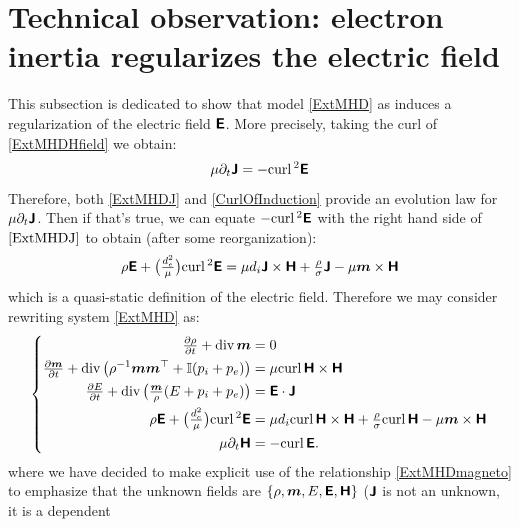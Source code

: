 \documentclass[preprint,1p]{elsarticle}
\begin{document}
\section{Technical observation: electron
inertia regularizes the electric field}\label{EliminationOfDJDt}







This subsection is dedicated to show that model \eqref{ExtMHD} as induces a
regularization of the electric field $\boldsymbol{\mathsf{E}}$. More precisely, taking the curl
of \eqref{ExtMHDHfield} we obtain:
\begin{align}
\label{CurlOfInduction}
\mu \partial_t \boldsymbol{\mathsf{J}} = - \text{curl} \, \mathbf{}^2 \boldsymbol{\mathsf{E}}
\end{align}
Therefore, both \eqref{ExtMHDJ} and \eqref{CurlOfInduction} provide an
evolution law for $\mu \partial_t \boldsymbol{\mathsf{J}}$. Then if that's true, we can equate
$- \text{curl} \, \mathbf{}^2 \boldsymbol{\mathsf{E}}$ with the right hand side of $\eqref{ExtMHDJ}$ to obtain
(after some reorganization):
\begin{align*}
\rho \boldsymbol{\mathsf{E}} + \big(\tfrac{d_e^2}{\mu}\big) \text{curl} \, \mathbf{}^2 \boldsymbol{\mathsf{E}}
= \mu d_i \boldsymbol{\mathsf{J}} \times \boldsymbol{\mathsf{H}}
+ \tfrac{\rho}{\sigma} \boldsymbol{\mathsf{J}}
- \mu \boldsymbol{m} \times \boldsymbol{\mathsf{H}}
\end{align*}
which is a quasi-static definition of the electric field. Therefore we may
consider rewriting system \eqref{ExtMHD} as:
\begin{align}
\label{ExtMHDref00}
\left\{
\begin{aligned}
\tfrac{\partial \rho}{\partial t} + \diver{}\mom &= 0 \\
%
\tfrac{\partial \mom}{\partial t} + \diver{}
\big( \rho^{-1} \mom\mom^\transp
+ \mathbb{I} (p_i + p_e) \big)
&=
\mu \curl{}\Hfield \times \Hfield \\
%
\tfrac{\partial \totme}{\partial t} + \diver{}\big( \tfrac{\mom}{\rho} (\totme +
p_i + p_e) \big)
&=
\Efield \cdot\current \\
%
%
\rho \Efield + \big(\tfrac{d_e^2}{\mu}\big) \curl{}^2 \Efield
&= \mu d_i \curl{}\Hfield \times \Hfield
+ \tfrac{\rho}{\conduct} \curl{}\Hfield
- \mu \mom \times \Hfield \\
%
\mu \partial_t \Hfield  &= - \curl{}\Efield .
\end{aligned}
\right.
\end{align}
where we have decided to make explicit use of the relationship
\eqref{ExtMHDmagneto} to emphasize that the unknown fields are $\{\rho , \boldsymbol{m} ,
E , \boldsymbol{\mathsf{E}},\boldsymbol{\mathsf{H}}\}$ ($\boldsymbol{\mathsf{J}}$ is not an unknown, it is a dependent
\end{document}
